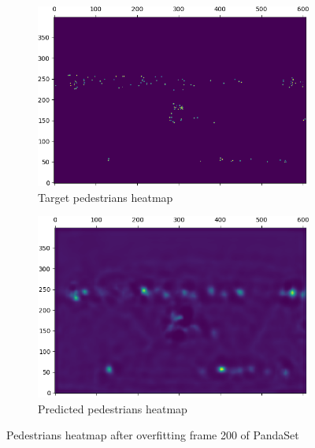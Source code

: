 \documentclass[letter]{article}
\begin{document}
	\begin{figure}[h]
		\begin{subfigure}[t]{0.49\textwidth}
			\centering
			\includegraphics[width=\linewidth]{images/hm_overfit_target_pedes.png}
			\caption{Target pedestrians heatmap}
			\label{fig:hmpedes_a}
		\end{subfigure}
		\begin{subfigure}[t]{0.49\textwidth}
			\centering
			\includegraphics[width=\linewidth]{images/hm_overfit_pedes.png}
			\caption{Predicted pedestrians heatmap}
			\label{fig:hmpedes_b}
		\end{subfigure}

		\caption{Pedestrians heatmap after overfitting frame 200 of PandaSet}
		\vspace*{3mm}
	\end{figure}
\end{document}
